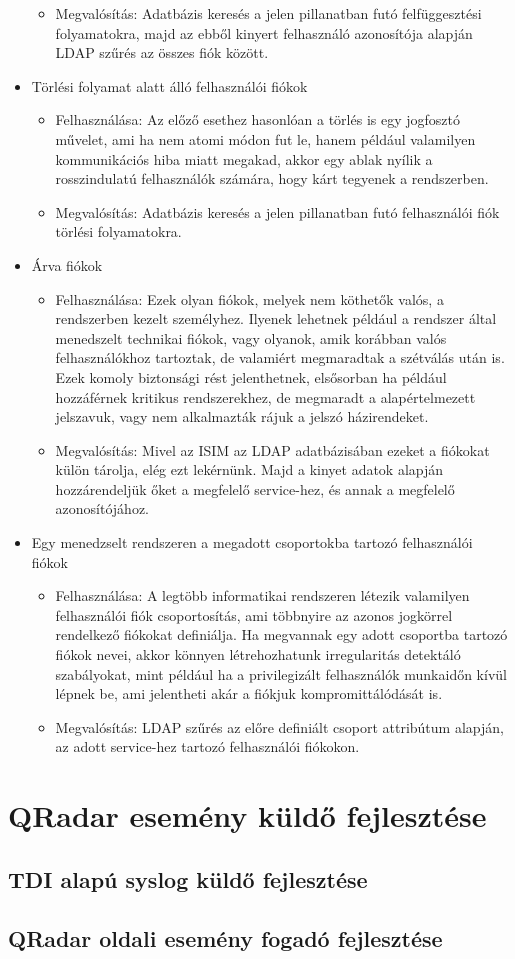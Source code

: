 \begin{itemize}
\begin{itemize}
		\item Megvalósítás: Adatbázis keresés a jelen pillanatban futó felfüggesztési folyamatokra, majd az ebből kinyert felhasználó azonosítója alapján LDAP szűrés az összes fiók között.
	\end{itemize}
	\item Törlési folyamat alatt álló felhasználói fiókok
	\begin{itemize}
		\small
		\item Felhasználása: Az előző esethez hasonlóan a törlés is egy jogfosztó művelet, ami ha nem atomi módon fut le, hanem például valamilyen kommunikációs hiba miatt megakad, akkor egy ablak nyílik a rosszindulatú felhasználók számára, hogy kárt tegyenek a rendszerben.
		\item Megvalósítás:  Adatbázis keresés a jelen pillanatban futó felhasználói fiók törlési folyamatokra.
	\end{itemize}
	\item Árva fiókok
	\begin{itemize}
		\small
		\item Felhasználása: Ezek olyan fiókok, melyek nem köthetők valós, a rendszerben kezelt személyhez. Ilyenek lehetnek például a rendszer által menedszelt technikai fiókok, vagy olyanok, amik korábban valós felhasználókhoz tartoztak, de valamiért megmaradtak a szétválás után is. Ezek komoly biztonsági rést jelenthetnek, elsősorban ha például hozzáférnek kritikus rendszerekhez, de megmaradt a alapértelmezett jelszavuk, vagy nem alkalmazták rájuk a jelszó házirendeket.
		\item Megvalósítás: Mivel az ISIM az LDAP adatbázisában ezeket a fiókokat külön tárolja, elég ezt lekérnünk. Majd a kinyet adatok alapján hozzárendeljük őket a megfelelő service-hez, és annak a megfelelő azonosítójához.
	\end{itemize}
	\item Egy menedzselt rendszeren a megadott csoportokba tartozó felhasználói fiókok
	\begin{itemize}
		\small
		\item Felhasználása: A legtöbb informatikai rendszeren létezik valamilyen felhasználói fiók csoportosítás, ami többnyire az azonos jogkörrel rendelkező fiókokat definiálja. Ha megvannak egy adott csoportba tartozó fiókok nevei, akkor könnyen létrehozhatunk irregularitás detektáló szabályokat, mint például ha a privilegizált felhasználók munkaidőn kívül lépnek be, ami jelentheti akár a fiókjuk kompromittálódását is.
		\item Megvalósítás: LDAP szűrés az előre definiált csoport attribútum alapján, az adott service-hez tartozó felhasználói fiókokon.
	\end{itemize}
	
\end{itemize}
\section{QRadar esemény küldő fejlesztése}
\subsection{TDI alapú syslog küldő fejlesztése}
\subsection{QRadar oldali esemény fogadó fejlesztése}
